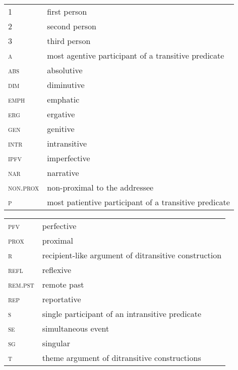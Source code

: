 \documentclass[output=paper,colorlinks,citecolor=brown,modfonts,nonflat]{langscibook}
\begin{document}
\begin{tabularx}{.45\textwidth}[t]{lQ}
\textsc{1} & first person\\
\textsc{2} & second person\\
\textsc{3} & third person\\
\textsc{a} & most agentive participant of a transitive predicate\\
\textsc{abs} & absolutive\\
\textsc{dim} & diminutive\\
\textsc{emph} & emphatic\\
\textsc{erg} & ergative\\
\textsc{gen} & genitive\\
\textsc{intr} & intransitive\\
\textsc{ipfv} & imperfective\\
\textsc{nar} & narrative\\
\textsc{non.prox} & non-proximal to the addressee\\
\textsc{p} & most patientive participant of a transitive predicate\\
\end{tabularx}
\begin{tabularx}{.45\textwidth}[t]{lQ}
\textsc{pfv} & perfective\\
\textsc{prox} & proximal\\
\textsc{r} & recipient-like argument of ditransitive construction\\
\textsc{refl} & reflexive\\
\textsc{rem.pst} & remote past\\
\textsc{rep} & reportative\\
\textsc{s} & single participant of an intransitive predicate\\
\textsc{se} & simultaneous event\\
\textsc{sg} & singular\\
\textsc{t} & theme argument of ditransitive constructions\\
\end{tabularx}

\sloppy\printbibliography[heading=subbibliography,notkeyword=this]
\end{document}
